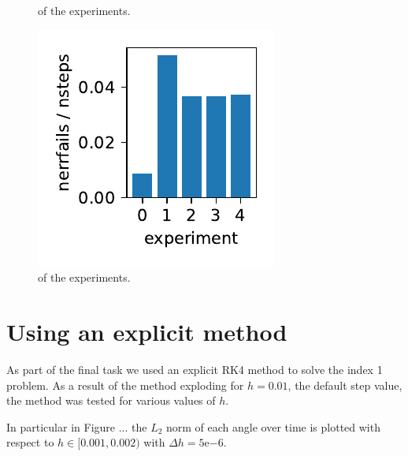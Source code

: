 \documentclass{report}
\begin{document}
\begin{figure}[h]
\begin{minipage}[t]{0.3\textwidth}
\caption{ of the experiments.}
\label{pl:njacs_nsteps_indx1}
\end{minipage}
\hfill
\begin{minipage}[t]{0.3\textwidth}
\centering
\includegraphics[width=\textwidth]{../Plots/Project2_main/Figure_712}
\caption{ of the experiments.}
\label{pl:nerrfails_nsteps_indx1}
\end{minipage}
\end{figure}

\section*{Using an explicit method}

As part of the final task we used an explicit RK4 method to solve the index 1 problem. As a result of the method exploding for $h=0.01$, the default step value, the method was tested for various values of $h$.

In particular in Figure ... the $L_2$ norm of each angle over time is plotted with respect to $h \in [0.001, 0.002)$ with $\Delta h = 5\mathrm{e}{-6}$.
\end{document}
